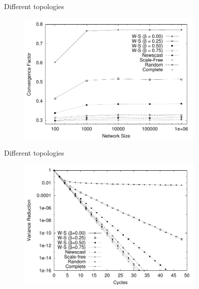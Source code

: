 \begin{frame}{Different topologies}

\begin{figure}
	\includegraphics[width=0.80\textwidth]{figs/11/rate}
\end{figure}

\end{frame}

\begin{frame}{Different topologies}

\begin{figure}
	\includegraphics[width=0.80\textwidth]{figs/11/reduction}
\end{figure}

\end{frame}


